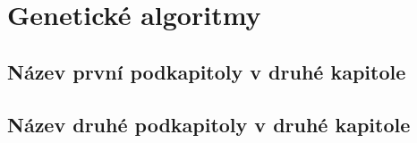 \chapter{Genetické algoritmy}

\section{Název první podkapitoly v druhé kapitole}

\section{Název druhé podkapitoly v druhé kapitole}

